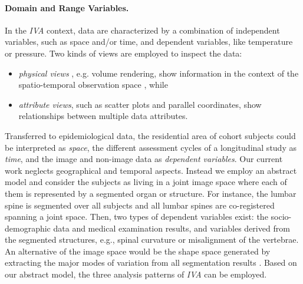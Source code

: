 \documentclass[journal]{style/vgtc} 			          %
\begin{document}
\paragraph{Domain and Range Variables. }
In the \emph{IVA} context, data are characterized by a combination of independent variables, such as space and/or time, and dependent variables, like temperature or pressure.
%
Two kinds of views are employed to inspect the data:
\begin{itemize} \itemsep0.2em
	\item \emph{physical views} \cite{Oeltze2013}, e.g. volume rendering, show information in the context of the spatio-temporal observation space \cite{Oeltze2007}, while
	\item \emph{attribute views}, such as scatter plots and parallel coordinates, show relationships between multiple data attributes.
\end{itemize}
Transferred to epidemiological data, the residential area of cohort subjects could be interpreted as \emph{space}, the different assessment cycles of a longitudinal study as \emph{time}, and the image and non-image data as \emph{dependent variables}.
%
Our current work neglects geographical and temporal aspects.
%
Instead we employ an abstract model and consider the subjects as living in a joint image space where each of them is represented by a segmented organ or structure.
%
For instance, the lumbar spine is segmented over all subjects and all lumbar spines are co-registered spanning a joint space.
%
Then, two types of dependent variables exist: the socio-demographic data and medical examination results, and variables derived from the segmented structures, e.g., spinal curvature or misalignment of the vertebrae.
An alternative of the image space would be the shape space generated by extracting the major modes of variation from all segmentation results \cite{Busking2010a}.
%
Based on our abstract model, the three analysis patterns of \emph{IVA} can be employed.
\end{document}
